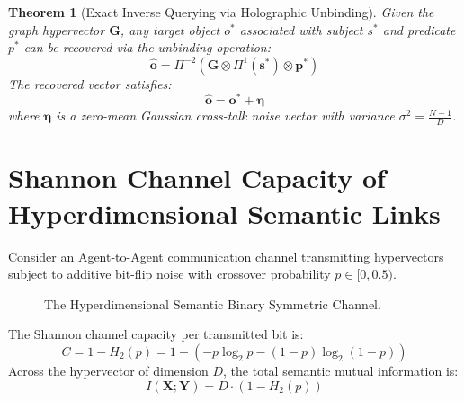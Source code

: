 \documentclass[12pt,oneside,a4paper]{book}
\theoremstyle{definition}
\theoremstyle{plain}
\newtheorem{theorem}{Theorem}[chapter]
\theoremstyle{remark}
\begin{document}
\begin{theorem}[Exact Inverse Querying via Holographic Unbinding]
Given the graph hypervector $\mathbf{G}$, any target object $o^*$ associated with subject $s^*$ and predicate $p^*$ can be recovered via the unbinding operation:
\begin{equation}
    \widehat{\mathbf{o}} = \Pi^{-2}\left( \mathbf{G} \otimes \Pi^1(\mathbf{s}^*) \otimes \mathbf{p}^* \right)
\end{equation}
The recovered vector satisfies:
\begin{equation}
    \widehat{\mathbf{o}} = \mathbf{o}^* + \mathbf{\eta}
\end{equation}
where $\mathbf{\eta}$ is a zero-mean Gaussian cross-talk noise vector with variance $\sigma^2 = \frac{N-1}{D}$.
\end{theorem}

\section{Shannon Channel Capacity of Hyperdimensional Semantic Links}
Consider an Agent-to-Agent communication channel transmitting hypervectors subject to additive bit-flip noise with crossover probability $p \in [0, 0.5)$.

\begin{figure}[h]
\centering
{}
\caption{The Hyperdimensional Semantic Binary Symmetric Channel.}
\end{figure}

The Shannon channel capacity per transmitted bit is:
\begin{equation}
    C = 1 - H_2(p) = 1 - \left( -p \log_2 p - (1-p) \log_2(1-p) \right)
\end{equation}
Across the hypervector of dimension $D$, the total semantic mutual information is:
\begin{equation}
    I(\mathbf{X}; \mathbf{Y}) = D \cdot (1 - H_2(p))
\end{equation}
\end{document}
